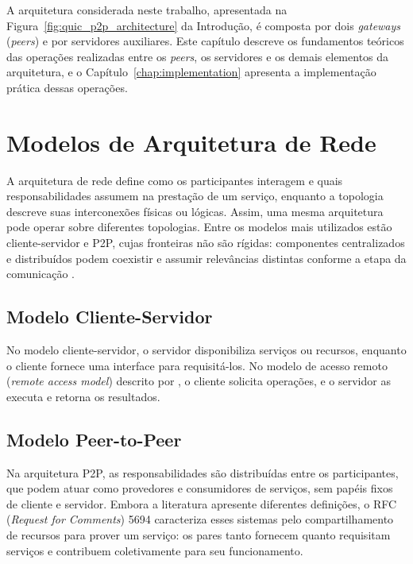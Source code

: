 A arquitetura considerada neste trabalho, apresentada na Figura~\ref{fig:quic_p2p_architecture} da Introdução, é composta por dois \textit{gateways} (\textit{peers}) e por servidores auxiliares. Este capítulo descreve os fundamentos teóricos das operações realizadas entre os \textit{peers}, os servidores e os demais elementos da arquitetura, e o Capítulo~\ref{chap:implementation} apresenta a implementação prática dessas operações.



\section{Modelos de Arquitetura de Rede}
\label{sec:network_architecture_models}

A arquitetura de rede define como os participantes interagem e quais responsabilidades assumem na prestação de um serviço, enquanto a topologia descreve suas interconexões físicas ou lógicas. Assim, uma mesma arquitetura pode operar sobre diferentes topologias. Entre os modelos mais utilizados estão cliente-servidor e P2P, cujas fronteiras não são rígidas: componentes centralizados e distribuídos podem coexistir e assumir relevâncias distintas conforme a etapa da comunicação \citep{RFC5694}.

\subsection{Modelo Cliente-Servidor}

No modelo cliente-servidor, o servidor disponibiliza serviços ou recursos, enquanto o cliente fornece uma interface para requisitá-los. No modelo de acesso remoto (\textit{remote access model}) descrito por \citep{Tanenbaum2007}, o cliente solicita operações, e o servidor as executa e retorna os resultados.

\subsection{Modelo Peer-to-Peer}
\label{sec:p2p_model}

Na arquitetura P2P, as responsabilidades são distribuídas entre os participantes, que podem atuar como provedores e consumidores de serviços, sem papéis fixos de cliente e servidor. Embora a literatura apresente diferentes definições, o RFC (\textit{Request for Comments}) 5694 \citep{RFC5694} caracteriza esses sistemas pelo compartilhamento de recursos para prover um serviço: os pares tanto fornecem quanto requisitam serviços e contribuem coletivamente para seu funcionamento.

